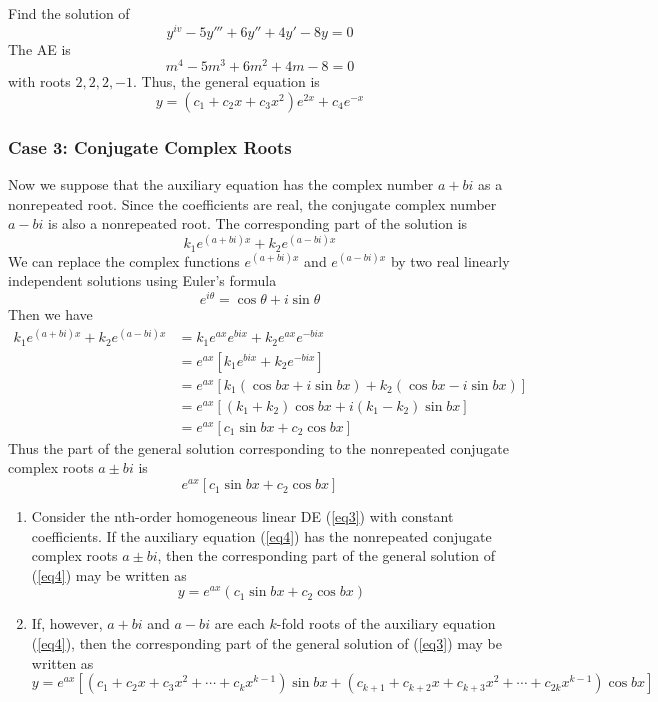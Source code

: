 \begin{example}{Find the solution of \[
    y^{iv} - 5y''' + 6y'' + 4y' - 8y = 0
\]}{}\vspace{-20pt}
    The AE is \[
        m^4 - 5m^3 + 6m^2 + 4m - 8 = 0
    \] with roots $2, 2, 2, -1$. Thus, the general equation is \[
        y = (c_1 + c_2x + c_3x^2)e^{2x} + c_4e^{-x}
    \]
\end{example}


\subsubsection{Case 3: Conjugate Complex Roots}

Now we suppose that the auxiliary equation has the complex number $a + bi$ as a nonrepeated root. Since the coefficients are real, the conjugate complex number $a - bi$ is also a nonrepeated root. The corresponding part of the solution is \[
    k_1e^{(a+bi)x} + k_2e^{(a-bi)x}
\]
We can replace the complex functions $e^{(a+bi)x}$ and $e^{(a-bi)x}$ by two real linearly independent solutions using Euler's formula \[
    e^{i\theta} = \cos{\theta} + i\sin{\theta}
\] Then we have
\begin{align*}
    k_1e^{(a+bi)x} + k_2e^{(a-bi)x} &= k_1e^{ax}e^{bix} + k_2e^{ax}e^{-bix} \\
    &= e^{ax}[ k_1e^{bix} + k_2e^{-bix} ] \\
    &= e^{ax}[ k_1(\cos{bx}+i\sin{bx}) + k_2(\cos{bx}-i\sin{bx}) ] \\
    &= e^{ax}[ (k_1+k_2)\cos{bx} + i(k_1-k_2)\sin{bx} ] \\
    &= e^{ax}[ c_1\sin{bx} + c_2\cos{bx} ]
\end{align*}
Thus the part of the general solution corresponding to the nonrepeated conjugate complex roots $a\pm bi$ is \[
    e^{ax}[c_1\sin{bx} + c_2\cos{bx}]
\]

\begin{theorem}{}{}
    \begin{enumerate}
        \item Consider the nth-order homogeneous linear DE (\ref{eq3}) with constant coefficients. If the auxiliary equation (\ref{eq4}) has the nonrepeated conjugate complex roots $a\pm bi$, then the corresponding part of the general solution of (\ref{eq4}) may be written as \[
            y = e^{ax}( c_1\sin{bx} + c_2\cos{bx} )
        \]
        \item If, however, $a+bi$ and $a-bi$ are each $k$-fold roots of the auxiliary equation (\ref{eq4}), then the corresponding part of the general solution of (\ref{eq3}) may be written as \[
                y = e^{ax}[ (c_1 + c_2x + c_3x^2 + \cdots + c_kx^{k-1})\sin{bx} + (c_{k+1} + c_{k+2}x + c_{k+3}x^2 + \cdots + c_{2k}x^{k-1})\cos{bx} ]
        \]
    \end{enumerate}
\end{theorem}

